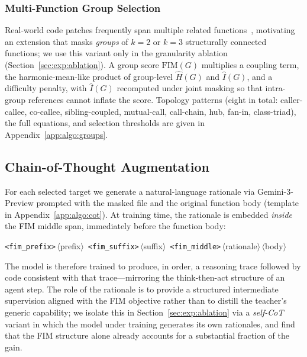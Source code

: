 \subsubsection{Multi-Function Group Selection}
\label{sec:method:groups}

Real-world code patches frequently span multiple related
functions~\citep{swebench}, motivating an extension that masks
\emph{groups} of $k=2$ or $k=3$ structurally connected functions; we use
this variant only in the granularity ablation
(Section~\ref{sec:exp:ablation}). A group score $\mathrm{FIM}(G)$
multiplies a coupling term, the harmonic-mean-like product of
group-level $\hat{H}(G)$ and $\hat{I}(G)$, and a difficulty penalty,
with $\hat{I}(G)$ recomputed under joint masking so that intra-group
references cannot inflate the score. Topology patterns (eight in total:
caller-callee, co-callee, sibling-coupled, mutual-call, call-chain, hub,
fan-in, class-triad), the full equations, and selection thresholds are
given in Appendix~\ref{app:algo:groups}.

\subsection{Chain-of-Thought Augmentation}
\label{sec:method:cot}

For each selected target we generate a natural-language rationale via
Gemini-3-Preview prompted with the masked file and the original function
body (template in Appendix~\ref{app:algo:cot}). At training time, the
rationale is embedded \emph{inside} the FIM middle span, immediately
before the function body:
%
\begin{center}\small
\texttt{<fim\_prefix>}\,$\langle$prefix$\rangle$\,%
\texttt{<fim\_suffix>}\,$\langle$suffix$\rangle$\,%
\texttt{<fim\_middle>}\,$\langle$rationale$\rangle$\,$\langle$body$\rangle$
\end{center}
%
The model is therefore trained to produce, in order, a reasoning trace
followed by code consistent with that trace---mirroring the
think-then-act structure of an agent step. The role of the rationale is
to provide a structured intermediate supervision aligned with the FIM
objective rather than to distill the teacher's generic capability; we
isolate this in Section~\ref{sec:exp:ablation} via a \emph{self-CoT}
variant in which the model under training generates its own rationales,
and find that the FIM structure alone already accounts for a substantial
fraction of the gain.

